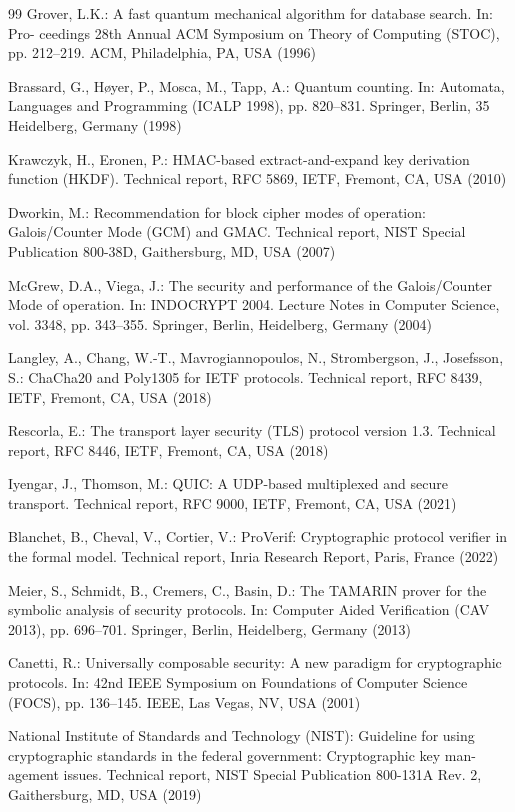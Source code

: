 \documentclass[5p,times]{elsarticle}
\begin{document}
\begin{thebibliography}{99}
Grover, L.K.: A fast quantum mechanical algorithm for database search. In: Pro- ceedings 28th Annual ACM Symposium on Theory of Computing (STOC), pp. 212--219. ACM, Philadelphia, PA, USA (1996)

Brassard, G., H{\o}yer, P., Mosca, M., Tapp, A.: Quantum counting. In: Automata, Languages and Programming (ICALP 1998), pp. 820--831. Springer, Berlin, 35 Heidelberg, Germany (1998)

Krawczyk, H., Eronen, P.: HMAC-based extract-and-expand key derivation function (HKDF). Technical report, RFC 5869, IETF, Fremont, CA, USA (2010)

Dworkin, M.: Recommendation for block cipher modes of operation: Galois/Counter Mode (GCM) and GMAC. Technical report, NIST Special Publication 800-38D, Gaithersburg, MD, USA (2007)

McGrew, D.A., Viega, J.: The security and performance of the Galois/Counter Mode of operation. In: INDOCRYPT 2004. Lecture Notes in Computer Science, vol. 3348, pp. 343--355. Springer, Berlin, Heidelberg, Germany (2004)

Langley, A., Chang, W.-T., Mavrogiannopoulos, N., Strombergson, J., Josefsson, S.: ChaCha20 and Poly1305 for IETF protocols. Technical report, RFC 8439, IETF, Fremont, CA, USA (2018)

Rescorla, E.: The transport layer security (TLS) protocol version 1.3. Technical report, RFC 8446, IETF, Fremont, CA, USA (2018)

Iyengar, J., Thomson, M.: QUIC: A UDP-based multiplexed and secure transport. Technical report, RFC 9000, IETF, Fremont, CA, USA (2021)

Blanchet, B., Cheval, V., Cortier, V.: ProVerif: Cryptographic protocol verifier in the formal model. Technical report, Inria Research Report, Paris, France (2022)

Meier, S., Schmidt, B., Cremers, C., Basin, D.: The TAMARIN prover for the symbolic analysis of security protocols. In: Computer Aided Verification (CAV 2013), pp. 696--701. Springer, Berlin, Heidelberg, Germany (2013)

Canetti, R.: Universally composable security: A new paradigm for cryptographic protocols. In: 42nd IEEE Symposium on Foundations of Computer Science (FOCS), pp. 136--145. IEEE, Las Vegas, NV, USA (2001)

National Institute of Standards and Technology (NIST): Guideline for using cryptographic standards in the federal government: Cryptographic key man- agement issues. Technical report, NIST Special Publication 800-131A Rev. 2, Gaithersburg, MD, USA (2019)


\end{thebibliography}
\end{document}
